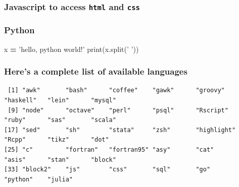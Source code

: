 \documentclass[10,portrait]{article}
\newenvironment{Shaded}{\begin{snugshade}}{\end{snugshade}}
\newcommand{\KeywordTok}[1]{\textcolor[rgb]{0.13,0.29,0.53}{\textbf{#1}}}
\newcommand{\StringTok}[1]{\textcolor[rgb]{0.31,0.60,0.02}{#1}}
\newcommand{\OperatorTok}[1]{\textcolor[rgb]{0.81,0.36,0.00}{\textbf{#1}}}
\newcommand{\BuiltInTok}[1]{#1}
\newcommand{\AttributeTok}[1]{\textcolor[rgb]{0.77,0.63,0.00}{#1}}
\newcommand{\NormalTok}[1]{#1}
\begin{document}
\subsubsection{\texorpdfstring{Javascript to access \texttt{html} and
\texttt{css}}{Javascript to access html and css}}\label{javascript-to-access-html-and-css}

\begin{Shaded}
\end{Shaded}

\subsubsection{Python}\label{python}

\begin{Shaded}
\begin{Highlighting}[]
\NormalTok{x }\OperatorTok{=} \StringTok{'hello, python world!'}
\BuiltInTok{print}\NormalTok{(x.split(}\StringTok{' '}\NormalTok{))}
\end{Highlighting}
\end{Shaded}

\subsubsection{Here's a complete list of available
languages}\label{heres-a-complete-list-of-available-languages}

\begin{Shaded}
\end{Shaded}

\begin{verbatim}
 [1] "awk"       "bash"      "coffee"    "gawk"      "groovy"    "haskell"   "lein"      "mysql"    
 [9] "node"      "octave"    "perl"      "psql"      "Rscript"   "ruby"      "sas"       "scala"    
[17] "sed"       "sh"        "stata"     "zsh"       "highlight" "Rcpp"      "tikz"      "dot"      
[25] "c"         "fortran"   "fortran95" "asy"       "cat"       "asis"      "stan"      "block"    
[33] "block2"    "js"        "css"       "sql"       "go"        "python"    "julia"    
\end{verbatim}
\end{document}
